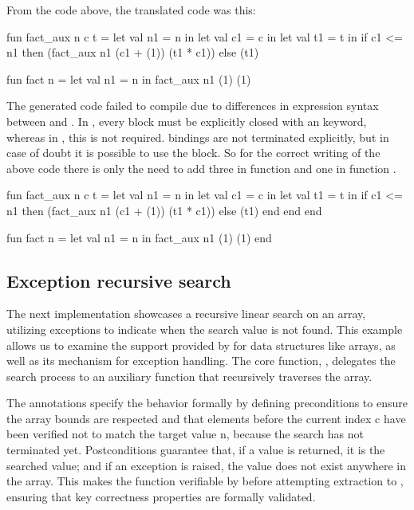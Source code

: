 From the code above, the translated code was this:

\begin{cakeml}
fun fact_aux n c t = let val n1 = n in
  let val c1 = c in
  let val t1 = t in
  if c1 <= n1 then (fact_aux n1 (c1 + (1)) (t1 * c1))  else (t1)

fun fact n = let val n1 = n in fact_aux n1 (1) (1)
\end{cakeml}

The generated \cml code failed to compile due to differences in  expression syntax between \ocaml and \cml. In \cml, every 
 block must be explicitly closed with an  keyword, whereas in \ocaml, this is not required. 
 bindings are not terminated explicitly, but in case of doubt it is possible to use the  block. 
So for the correct writing of the above code there is only the need to add three  in function  and 
one  in function .

\begin{cakeml}
fun fact_aux n c t = let val n1 = n in
  let val c1 = c in
  let val t1 = t in
  if c1 <= n1 then (fact_aux n1 (c1 + (1)) (t1 * c1))  else (t1)
  end end end

fun fact n = let val n1 = n in fact_aux n1 (1) (1) end
\end{cakeml}

\subsection{Exception recursive search}

The next implementation showcases a recursive linear search on an array, utilizing exceptions to indicate when the search value 
is not found. This example allows us to examine the support provided by \ocaml for data structures like arrays, as well as its 
mechanism for exception handling. The core function, , delegates the search process to an auxiliary 
function that recursively traverses the array.

The \gospel annotations specify the behavior formally by defining preconditions to ensure the array bounds are respected
and that elements before the current index c have been verified not to match the target value n, because the search has not terminated yet. 
Postconditions guarantee that, if a value is returned, it is the searched value; and if an exception  is raised, 
the value does not exist anywhere in the array. This makes the function verifiable by \whythree before attempting extraction to \cml, ensuring 
that key correctness properties are formally validated.

